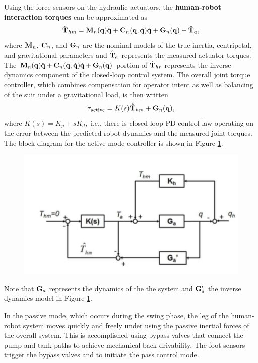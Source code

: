 Using the force sensors on the hydraulic actuators, the {\bf human-robot interaction torques} can be approximated as
\begin{equation}
\hat{{\bf T}}_{hm} = {\bf M}_n({\bf q})\ddot{{\bf q}} + {\bf C}_n({\bf q},\dot{{\bf q}})\dot{{\bf q}} + {\bf G}_n({\bf q}) - \hat{{\bf T}}_a, \notag
\end{equation}
where ${\bf M}_n$, ${\bf C}_n$, and ${\bf G}_n$ are the nominal models of the true inertia, centripetal, and gravitational parameters and $\hat{{\bf T}}_a$ represents the measured actuator torques.  The ${\bf M}_n({\bf q})\ddot{{\bf q}} + {\bf C}_n({\bf q},\dot{{\bf q}})\dot{{\bf q}} + {\bf G}_n({\bf q}) $ portion of $\hat{{\bf T}}_{hr}$ represents the inverse dynamics component of the closed-loop control system.  The overall joint torque controller, which combines compensation for operator intent as well as balancing of the suit under a gravitational load, is then written \[ {\bf\tau}_\text{active} = K(s) \hat{{\bf T}}_{hm} + {\bf G}_n({\bf q}),\] where $K(s) = K_p +s K_d,$ i.e., there is closed-loop PD control law operating on the error between the predicted robot dynamics and the measured joint torques.  The block diagram for the active mode controller is shown in Figure \ref{fig:blockDia}. 
 \begin{figure}[thpb]
\centering
\includegraphics[width=3.in]{exos/figs/hydLowerExrem/blockDia}
  \caption{}
  \vspace{-0.2in}
 \label{fig:blockDia}   
 \end{figure}
 Note that ${\bf G}_a$ represents the dynamics of the the system and ${\bf G}_a'$ the inverse dynamics model in Figure \ref{fig:blockDia}.

 In the passive mode, which occurs during the swing phase, the leg of the human-robot system moves quickly and freely under using the passive inertial forces of the overall system.  This is accomplished using bypass valves that connect the pump and tank paths to achieve mechanical back-drivability.  The foot sensors trigger the bypass valves and to initiate the pass control mode.

